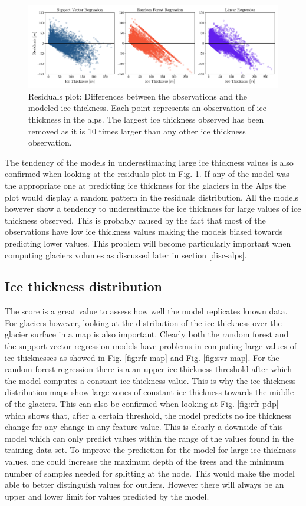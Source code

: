 \begin{figure}[!tp]
	\centering		  
	\includegraphics[width=1.\textwidth]{figures/residuals_plot.pdf}
	\caption{Residuals plot: Differences between the observations and the modeled ice thickness. Each point represents an observation of ice thickness in the alps. The largest ice thickness observed has been removed as it is 10 times larger than any other ice thickness observation.}
	\label{fig:residuals}
\end{figure}

The tendency of the models in underestimating large ice thickness values is also confirmed when looking at the residuals plot in Fig. \ref{fig:residuals}. If any of the model was the appropriate one at predicting ice thickness for the glaciers in the Alps the plot would display a random pattern in the residuals distribution. All the models however show a tendency to underestimate the ice thickness for large values of ice thickness observed. This is probably caused by the fact that most of the observations have low ice thickness values making the models biased towards predicting lower values. This problem will become particularly important when computing glaciers volumes as discussed later in section \ref{disc-alps}.

\subsection{Ice thickness distribution}\label{disc-vol-dist}
The score is a great value to assess how well the model replicates known data. For glaciers however, looking at the distribution of the ice thickness over the glacier surface in a map is also important. Clearly both the random forest and the support vector regression models have problems in computing large values of ice thicknesses as showed in Fig. \ref{fig:rfr-map} and Fig. \ref{fig:svr-map}. For the random forest regression there is a an upper ice thickness threshold after which the model computes a constant ice thickness value. This is why the ice thickness distribution maps show large zones of constant ice thickness towards the middle of the glaciers. This can also be confirmed when looking at Fig. \ref{fig:rfr-pdp} which shows that, after a certain threshold, the model predicts no ice thickness change for any change in any feature value. This is clearly a downside of this model which can only predict values within the range of the values found in the training data-set. To improve the prediction for the model for large ice thickness values, one could increase the maximum depth of the trees and the minimum number of samples needed for splitting at the node. This would make the model able to better distinguish values for outliers. However there will always be an upper and lower limit for values predicted by the model.

